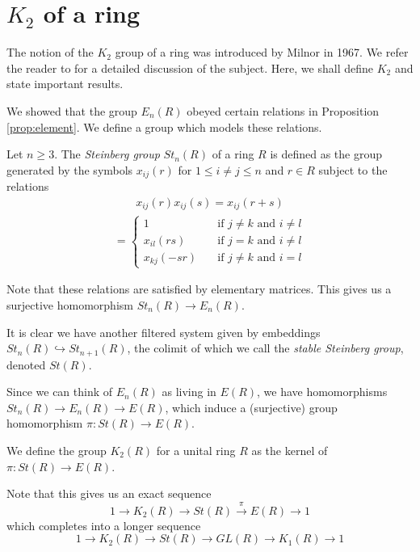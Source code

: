 

\section{$K_2$ of a ring}

The notion of the $K_2$ group of a ring was introduced by Milnor in 1967. 
We refer the reader to \cite{Milnor} for a detailed discussion of the subject.
Here, we shall define $K_2$ and state important results.

We showed that the group $E_n(R)$ obeyed certain relations in Proposition \ref{prop:element}.
We define a group which models these relations.

\begin{definition}[$K_2(R)$]
Let $n \geq 3$.
The \emph{Steinberg group} $St_n(R)$ of a ring $R$ is defined as the group generated
by the symbols $x_{ij}(r)$ for $1 \leq i \neq j \leq n$ and $r \in R$
subject to the relations
\begin{align}
  x_{ij}(r) x_{ij}(s) = x_{ij} (r + s) 
\end{align}
\begin{align}
  [x_{ij}(r),x_{kl}(s)] = \begin{cases}
  1 \quad &\text{if $j \neq k$ and $i \neq l$} \\
  x_{il}(rs) \quad &\text{if $j = k$ and $i \neq l$} \\
  x_{kj}(-sr) \quad& \text{if $j \neq k$ and $i = l$}
  \end{cases}
\end{align}
\end{definition}

Note that these relations are satisfied by elementary matrices.
This gives us a surjective homomorphism $St_n(R) \to E_n(R)$.

It is clear we have another filtered system given by embeddings $St_n(R) \hookrightarrow St_{n+1}(R)$,
the colimit of which we call the \emph{stable Steinberg group}, denoted $St(R)$.

Since we can think of $E_n(R)$ as living in $E(R)$, we have homomorphisms $St_n(R) \to E_n(R) \to E(R)$,
which induce a (surjective) group homomorphism $\pi : St(R) \to E(R)$.

\begin{definition}[$K_2$ of a ring]
We define the group $K_2(R)$ for a unital ring $R$ as the kernel of $\pi : St(R) \to E(R)$.
\end{definition}
Note that this gives us an exact sequence
\begin{equation}
1 \to K_2(R) \to St(R) \xrightarrow{\pi} E(R) \to 1 
  \label{eq:K2exact}
\end{equation}
which completes into a longer sequence
\begin{equation}
1 \to K_2(R) \to St(R) \to GL(R) \to K_1(R) \to 1 
  \label{eq:K2longerexact}
\end{equation}


